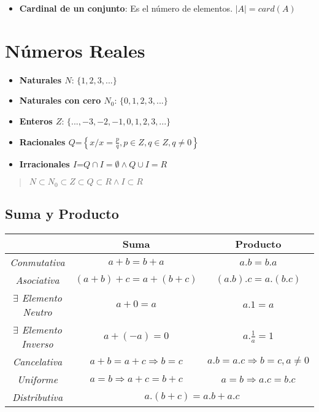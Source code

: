 \documentclass[10pt]{article}
\begin{document}
\begin{itemize}
\item \textbf{Cardinal de un conjunto}: Es el número de elementos. $|A| = card(A)$
\end{itemize}

\newpage
\section{Números Reales}
\begin{multicols}{2}
\begin{itemize}
\item \textbf{Naturales $N$}: $\{1,2,3,...\}$
\item \textbf{Naturales con cero $N_0$}: $\{0,1,2,3,...\}$
\item \textbf{Enteros $Z$}: $\{...,-3,-2,-1,0,1,2,3,...\}$
\item \textbf{Racionales $Q$}=$\left\{x/x=\frac{p}{q},p \in Z, q \in Z, q \not = 0\right\}$
\item \textbf{Irracionales $I$}=$Q \cap I = \emptyset \land Q \cup I = R$
\end{itemize}
\end{multicols}
\begin{quote}
\begin{center}
$N \subset N_0 \subset Z \subset Q \subset R \land I \subset R$
\end{center}
\end{quote}
\subsection{Suma y Producto}
\begin{table}[h]
\begin{center}
\begin{tabular}{|c|c|c|}
\hline
&Suma&Producto\\
\hline
\textit{Conmutativa}&$a+b=b+a$&$a.b=b.a$\\
\hline
\textit{Asociativa}&$(a+b)+c = a+(b+c)$&$(a.b).c=a.(b.c)$\\
\hline
\textit{$\exists$ Elemento Neutro}&$a+0=a$&$a.1=a$\\
\hline
\textit{$\exists$ Elemento Inverso}&$a+(-a)=0$&$a.\frac{1}{a}=1$\\
\hline
\textit{Cancelativa}&$a+b=a+c \Rightarrow b=c$&$a.b=a.c \Rightarrow b=c, a \not = 0$\\
\hline
\textit{Uniforme}&$a=b \Rightarrow a+c=b+c$&$a=b \Rightarrow a.c=b.c$\\
\hline
\textit{Distributiva}&\multicolumn{2}{|c|}{$a.(b+c) = a.b+a.c$}\\
\hline
\end{tabular}
\end{center}
\end{table}
\end{document}
